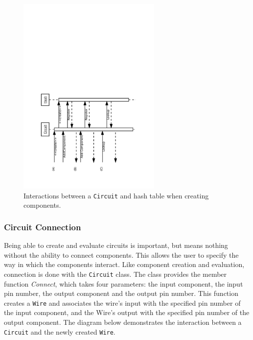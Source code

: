 \documentclass{article}
\newcommand{\ClassName}[1]{\texttt{#1}}
\newcommand{\FunctionName}[1]{\textit{#1}}
\begin{document}
\begin{figure}[H]
    \begin{center}
        \includegraphics[angle=270,width=200pt]{imgs/ComponentCreationInteraction.pdf}
    \end{center}
    \caption{Interactions between a \ClassName{Circuit} and hash table when creating components.}
\end{figure}

\subsubsection{Circuit Connection}

Being able to create and evaluate circuits is important, but means nothing without the ability to connect components. This allows the user to specify the way in which the components interact. Like component creation and evaluation, connection is done with the \ClassName{Circuit} class. The class provides the member function \FunctionName{Connect}, which takes four parameters: the input component, the input pin number, the output component and the output pin number. This function creates a \ClassName{Wire} and associates the wire’s input with the specified pin number of the input component, and the Wire’s output with the specified pin number of the output component. The diagram below demonstrates the interaction between a \ClassName{Circuit} and the newly created \ClassName{Wire}.
\end{document}
